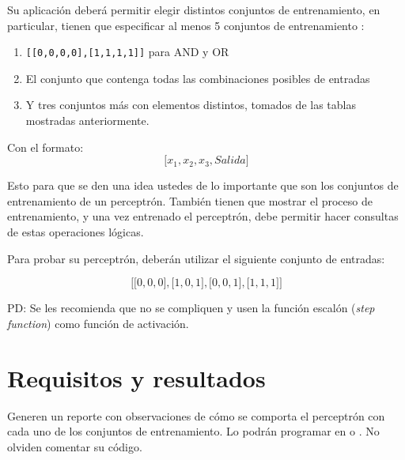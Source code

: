 Su aplicación deberá permitir elegir distintos conjuntos de entrenamiento, en particular, tienen que especificar al menos 5 conjuntos de entrenamiento : 

\begin{enumerate}
  \item \texttt{[[0,0,0,0],[1,1,1,1]]} para AND y OR
  \item El conjunto que contenga todas las combinaciones posibles de entradas
  \item Y tres conjuntos más con elementos distintos, tomados de las tablas mostradas anteriormente.
\end{enumerate}

Con el formato: \[\texttt{[}x_1, x_2, x_3, Salida\texttt{]} \]

\noindent Esto para que se den una idea ustedes de lo importante que son los conjuntos de entrenamiento de un perceptrón.
También tienen que mostrar el proceso de entrenamiento, y una vez entrenado el perceptrón, debe permitir hacer consultas de estas operaciones lógicas.\par
Para probar su perceptrón, deberán utilizar el siguiente conjunto de entradas:

\[\texttt{[}\texttt{[}0,0,0\texttt{]}, \texttt{[}1,0,1\texttt{]}, \texttt{[}0,0,1\texttt{]}, \texttt{[}1,1,1\texttt{]} \texttt{]}\]

\noindent PD: Se les recomienda que no se compliquen y usen la función escalón (\textit{step function}) como función de activación.\par


\section{Requisitos y resultados}

Generen un reporte con observaciones de cómo se comporta el perceptrón con cada uno de los conjuntos de entrenamiento. Lo podrán programar en  o . No olviden comentar su código.\medskip





